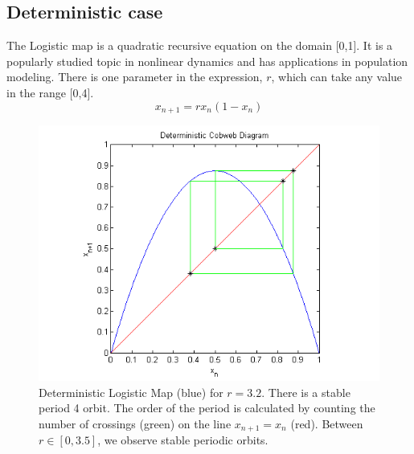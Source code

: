 \documentclass[12pt]{article}
\begin{document}
\subsection{Deterministic case}
\hspace{5mm}The Logistic map is a quadratic recursive equation on the domain
[0,1]. It is a popularly studied topic in nonlinear dynamics and has
applications in population modeling. There is one parameter in the
expression, $r$, which can take any value in the range [0,4]. 
\begin{equation*}
x_{n+1} = rx_n(1-x_n)
\end{equation*}
\begin{figure}[H]
	\begin{center}
		\includegraphics[scale=0.7]{det_cobweb}
\caption{Deterministic Logistic Map (blue) for $r=3.2$. There is a stable period
4 orbit. The order of the period is calculated by counting the number
of crossings (green) on the line $x_{n+1}=x_n$ (red). Between $r \in [0,3.5]$, we observe stable periodic orbits.}
	\end{center}
\end{figure}
\end{document}
